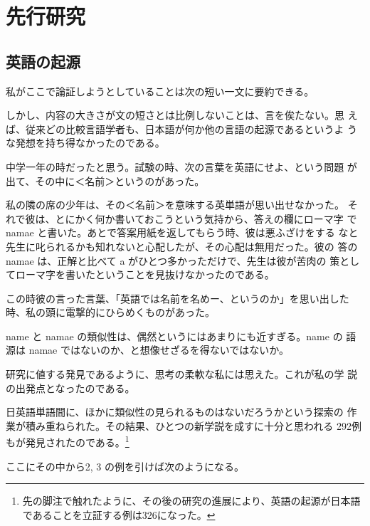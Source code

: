 \chapter{先行研究}

\section{英語の起源}

私がここで論証しようとしていることは次の短い一文に要約できる。


  しかし、内容の大きさが文の短さとは比例しないことは、言を俟たない。思
えば、従来どの比較言語学者も、日本語が何か他の言語の起源であるというよ
うな発想を持ち得なかったのである。

  中学一年の時だったと思う。試験の時、次の言葉を英語にせよ、という問題
が出て、その中に＜名前＞というのがあった。

  私の隣の席の少年は、その＜名前＞を意味する英単語が思い出せなかった。
それで彼は、とにかく何か書いておこうという気持から、答えの欄にローマ字
で namae と書いた。あとで答案用紙を返してもらう時、彼は悪ふざけをする
なと先生に叱られるかも知れないと心配したが、その心配は無用だった。彼の
答の namae は、正解と比べて a がひとつ多かっただけで、先生は彼が苦肉の
策としてローマ字を書いたということを見抜けなかったのである。

\noindent
この時彼の言った言葉、「英語では名前を名めー、というのか」を思い出した
時、私の頭に電撃的にひらめくものがあった。

  name と namae の類似性は、偶然というにはあまりにも近すぎる。name の
語源は namae ではないのか、と想像せざるを得ないではないか。

  研究に値する発見であるように、思考の柔軟な私には思えた。これが私の学
説の出発点となったのである。

  日英語単語間に、ほかに類似性の見られるものはないだろうかという探索の
作業が積み重ねられた。その結果、ひとつの新学説を成すに十分と思われる
292例もが発見されたのである。\footnote{
先の脚注で触れたように、その後の研究の進展により、英語の起源が日本語
であることを立証する例は326になった。
} %

  ここにその中から2, 3 の例を引けば次のようになる。


